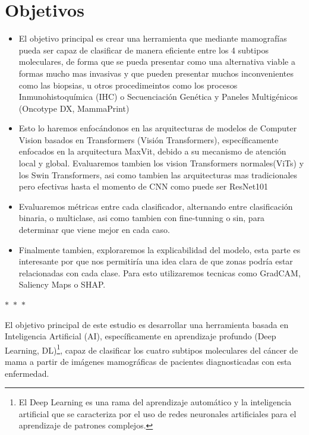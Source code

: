 \documentclass[a4paper,10pt]{book}
\begin{document}
\newpage

\section{Objetivos}

\begin{itemize}
  \item El objetivo principal es crear una herramienta que mediante mamografías pueda ser capaz de clasificar de manera eficiente entre los 4 subtipos moleculares, de forma que se pueda presentar como una alternativa viable a formas mucho mas invasivas y que pueden presentar muchos inconvenientes como las biopsias, u otros procedimeintos como los procesos Inmunohistoquímica (IHC) o Secuenciación Genética y Paneles Multigénicos (Oncotype DX, MammaPrint)
  \item Esto lo haremos enfocándonos en las arquitecturas de modelos de Computer Vision basados en Transformers (Visión Transformers), específicamente enfocados en la arquitectura MaxVit, debido a su mecanismo de atención local y global. Evaluaremos tambien los vision Transformers normales(ViTs) y los Swin Transformers, asi como tambien las arquitecturas mas tradicionales pero efectivas hasta el momento de CNN como puede ser ResNet101
  \item Evaluaremos métricas entre cada clasificador, alternando entre clasificación binaria, o multiclase, asi como tambien con fine-tunning o sin, para determinar que viene mejor en cada caso.
  \item Finalmente tambien, exploraremos la explicabilidad del modelo, esta parte es interesante por que nos permitiría una idea clara de que zonas podría estar relacionadas con cada clase. Para esto utilizaremos tecnicas como GradCAM, Saliency Maps o SHAP.
\end{itemize}

\begin{center}
  $\ast$~$\ast$~$\ast$
\end{center}


El objetivo principal de este estudio es desarrollar una herramienta basada en Inteligencia Artificial (AI), específicamente en aprendizaje profundo (Deep Learning, DL)\footnote{El Deep Learning es una rama del aprendizaje automático y la inteligencia artificial que se caracteriza por el uso de redes neuronales artificiales para el aprendizaje de patrones complejos.}, capaz de clasificar los cuatro subtipos moleculares del cáncer de mama a partir de imágenes mamográficas de pacientes diagnosticadas con esta enfermedad.
\end{document}
